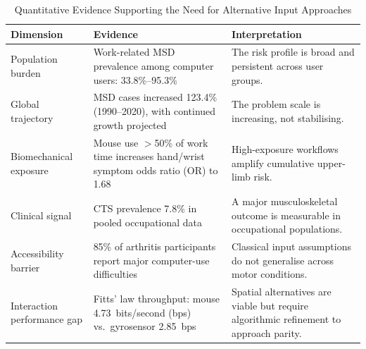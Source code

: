 \label{appendix:problem_indicators}

\begin{table}[H]
  \caption{Quantitative Evidence Supporting the Need for Alternative Input Approaches}
  \label{tbl:problem_indicators}
  \begin{tabularx}{\textwidth}{|Y|Y|Y|}
    \hline
    \textbf{Dimension} & \textbf{Evidence} & \textbf{Interpretation} \\
    \hline
    Population burden & Work-related MSD prevalence among computer users: 33.8\%--95.3\%~\cite{demissie2024wrmsd} & The risk profile is broad and persistent across user groups. \\
    \hline
    Global trajectory & MSD cases increased 123.4\% (1990--2020), with continued growth projected~\cite{gbd2023othermsd} & The problem scale is increasing, not stabilising. \\
    \hline
    Biomechanical exposure & Mouse use $>$50\% of work time increases hand/wrist symptom odds ratio (OR) to 1.68~\cite{andersen2003mouse} & High-exposure workflows amplify cumulative upper-limb risk. \\
    \hline
    Clinical signal & CTS prevalence 7.8\% in pooled occupational data~\cite{dale2013cts} & A major musculoskeletal outcome is measurable in occupational populations. \\
    \hline
    Accessibility barrier & 85\% of arthritis participants report major computer-use difficulties~\cite{baker2009arthritis} & Classical input assumptions do not generalise across motor conditions. \\
    \hline
    Interaction performance gap & Fitts' law throughput: mouse 4.73~bits/second (bps) vs.\ gyrosensor 2.85~bps~\cite{ramcharitar2017fitts} & Spatial alternatives are viable but require algorithmic refinement to approach parity. \\
    \hline
  \end{tabularx}
\end{table}